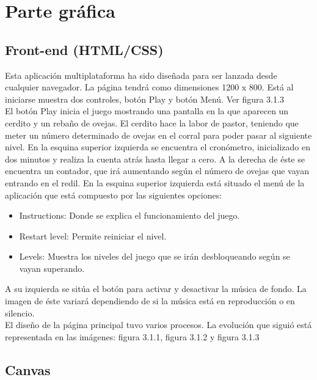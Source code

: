 \section{Parte gráfica}
\label{chap:grafica}

\subsection{Front-end (HTML/CSS)}
\label{sec:front_end}

Esta aplicación multiplataforma ha sido diseñada para ser lanzada desde cualquier navegador. La página tendrá como dimensiones 1200 x 800. 
Está al iniciarse muestra dos controles, botón Play y botón Menú. Ver figura 3.1.3\\

El botón Play inicia el juego mostrando una pantalla en la que aparecen un cerdito y un rebaño de ovejas. El cerdito hace la labor de pastor, 
teniendo que meter un número determinado de ovejas en el corral para poder pasar al siguiente nivel. 
En la esquina superior izquierda se encuentra el cronómetro, inicializado en dos minutos y realiza la cuenta atrás hasta llegar a cero.
A la derecha de éste se encuentra un contador, que irá aumentando según el número de ovejas que vayan entrando en el redil.
En la esquina superior izquierda está situado el menú de la aplicación que está compuesto por las siguientes opciones:

\begin{itemize}
 \item Instructions: Donde se explica el funcionamiento del juego.
 \item Restart level: Permite reiniciar el nivel.
 \item Levels: Muestra los niveles del juego que se irán desbloqueando según se vayan superando.
\end{itemize}

A su izquierda se sitúa el botón para activar y desactivar la música de fondo. La imagen de éste variará dependiendo de si la música 
está en reproducción o en silencio.\\

El diseño de la página principal tuvo varios procesos. La evolución que siguió está representada en las imágenes: figura 3.1.1, figura 3.1.2 y 
figura 3.1.3 


\subsection{Canvas}
\label{sec:canvas}


